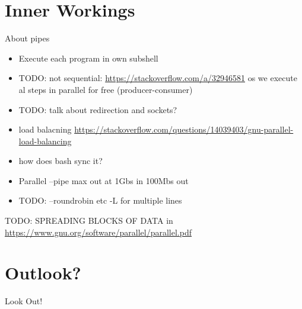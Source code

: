 \section{Inner Workings}
\begin{frame}{About pipes}
\begin{itemize}
   \item Execute each program in own subshell
   \item TODO: not sequential: \url{https://stackoverflow.com/a/32946581} os we execute al steps in parallel for free (producer-consumer) %
   \item TODO: talk about redirection and sockets?
   \item load balacning \url{https://stackoverflow.com/questions/14039403/gnu-parallel-load-balancing}
   \item how does bash sync it?
   \item Parallel --pipe max out at 1Gbs in 100Mbs out
   \item TODO: --roundrobin etc -L for multiple lines
\end{itemize}
\end{frame}
\begin{frame}
 TODO: SPREADING BLOCKS OF DATA
 in \url{https://www.gnu.org/software/parallel/parallel.pdf}
\end{frame}

\section{Outlook?}
\begin{frame}{Look Out!}
\end{frame}


